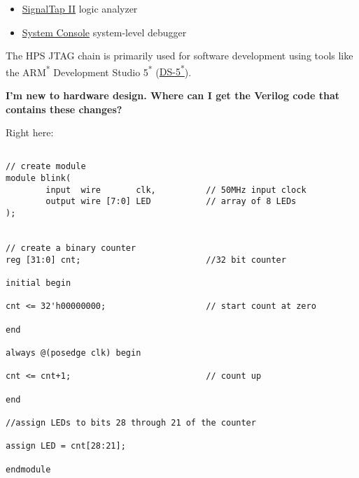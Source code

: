 \begin{flushleft}
\begin{itemize}
\item \href{https://www.altera.com/support/training/demonstrations/signaltap-ii.html}{SignalTap II} logic analyzer
\item \href{https://www.altera.com/products/design-software/fpga-design/quartus-prime/features/qts-systems-console.html}{System Console} system-level debugger
\end{itemize}

The HPS JTAG chain is primarily used for software development using tools like the ARM\textsuperscript{*} Development Studio 5\textsuperscript{*} (\href{https://www.altera.com/products/design-software/embedded-software-developers/soc-eds/ds-5-toolkit.html}{DS-5\textsuperscript{*}}).
\newline

\hypertarget{side9}{\textbf{I'm new to hardware design. Where can I get the Verilog code that contains these changes?}}
\newline
Right here:

\begin{verbatim}

// create module
module blink(
        input  wire       clk,          // 50MHz input clock
        output wire [7:0] LED           // array of 8 LEDs
);


// create a binary counter
reg [31:0] cnt;                         //32 bit counter

initial begin

cnt <= 32'h00000000;                    // start count at zero

end

always @(posedge clk) begin

cnt <= cnt+1;                           // count up

end

//assign LEDs to bits 28 through 21 of the counter

assign LED = cnt[28:21];

endmodule

\end{verbatim}

\end{flushleft}



